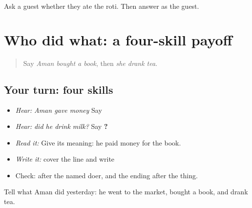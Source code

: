 \begin{tcolorbox}[breakable,colback=teal!4,colframe=teal!35!black,title={Before you move on}]
Ask a guest whether they ate the roti. Then answer as the guest.
\end{tcolorbox}
\section[\texorpdfstring{\pa{ਅਮਨ} \pa{ਨੇ} \pa{ਕਿਤਾਬ} \pa{ਖ਼ਰੀਦੀ।} (Aman ne kitāb …)}{ਅਮਨ ਨੇ ਕਿਤਾਬ ਖ਼ਰੀਦੀ। (Aman ne kitāb …)}]{Who did what: a four-skill payoff}

\label{lesson:PA-C220-payoff}



\begin{quote}
Say \emph{Aman bought a book}, then \emph{she drank tea}.
\end{quote}

\subsection*{Your turn: four skills}
\begin{itemize}
\raggedright
  \item \emph{Hear:} \emph{Aman gave money} Say \textbf{   }
  \item \emph{Hear:} \emph{did he drink milk?} Say \textbf{    ?}
  \item \emph{Read it:} \textbf{     } Give its meaning: he paid money for the book.
  \item \emph{Write it:} cover the line and write \textbf{   }
  \item Check: \textbf{} after the named doer, and the ending after the thing.
\end{itemize}

\begin{tcolorbox}[breakable,colback=teal!4,colframe=teal!35!black,title={Before you move on}]
Tell what Aman did yesterday: he went to the market, bought a book, and drank tea.
\end{tcolorbox}
